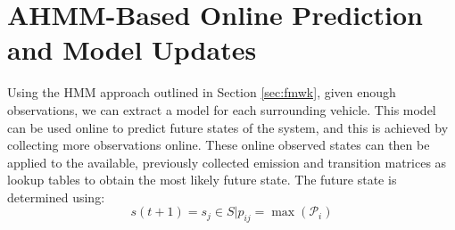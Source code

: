 \documentclass[letterpaper, 10 pt, conference]{ieeeconf}  %
\newcommand\NB[1]{$\spadesuit$\footnote{NB: #1}}
\begin{document}
\section{AHMM-Based Online Prediction and Model Updates} \label{sec:ahmmpredupdate} %
  Using the HMM approach outlined in Section \ref{sec:fmwk}, given enough observations, we can extract a model for each surrounding vehicle. This model can be used online to predict future states of the system, and this is achieved by collecting more observations online. These online observed states can then be applied to the available, previously collected emission and transition matrices as lookup tables to obtain the most likely future state. The future state is determined using:
\begin{equation} \label{eq:pred}
   s(t+1) = s_j \in S \vert p_{ij}=\max(\mathcal{P}_i)
\end{equation}
\end{document}
